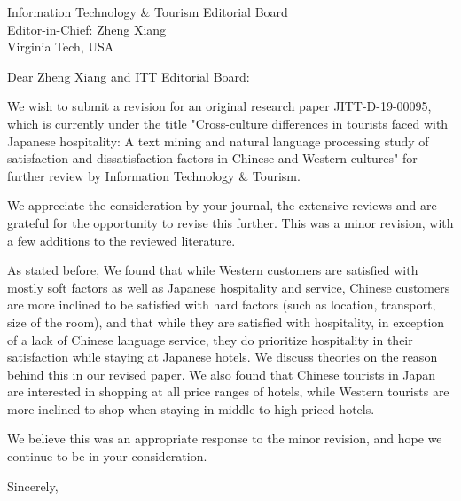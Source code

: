 \documentclass{letter}
\begin{document}
\begin{letter}{
Information Technology \& Tourism Editorial Board \\
Editor-in-Chief:  Zheng Xiang\\
Virginia Tech, USA}

\opening{Dear Zheng Xiang and ITT Editorial Board:}

We wish to submit a revision for an original research paper JITT-D-19-00095, which is currently under the title "Cross-culture differences in tourists faced with Japanese hospitality: A text mining and natural language processing study of satisfaction and dissatisfaction factors in Chinese and Western cultures" for further review by Information Technology \& Tourism.

We appreciate the consideration by your journal, the extensive reviews and are grateful for the opportunity to revise this further. This was a minor revision, with a few additions to the reviewed literature. 

As stated before, We found that while Western customers are satisfied with mostly soft factors as well as Japanese hospitality and service, Chinese customers are more inclined to be satisfied with hard factors (such as location, transport, size of the room), and that while they are satisfied with hospitality, in exception of a lack of Chinese language service, they do prioritize hospitality in their satisfaction while staying at Japanese hotels. We discuss theories on the reason behind this in our revised paper. We also found that Chinese tourists in Japan are interested in shopping at all price ranges of hotels, while Western tourists are more inclined to shop when staying in middle to high-priced hotels. 

We believe this was an appropriate response to the minor revision, and hope we continue to be in your consideration.

\closing{Sincerely,}


\end{letter}
\end{document}
